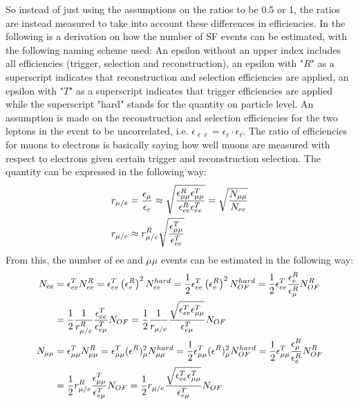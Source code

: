 So instead of just using the assumptions on the ratios to be 0.5 or 1, the ratios are instead measured to take into account these differences in efficiencies. 
In the following is a derivation on how the number of SF events can be estimated, with the following naming scheme used: 
An epsilon without an upper index includes all efficiencies (trigger, selection and reconstruction), an epsilon with "$R$" as a superscript indicates that reconstruction and selection efficiencies are applied, an epsilon with "$T$" as a superscript indicates that trigger efficiencies are applied while the superscript "hard" stands for the quantity on particle level.
An assumption is made on the reconstruction and selection efficiencies for the two leptons in the event to be uncorrelated, i.e. $\epsilon_{\ell\ell}=\epsilon_{\ell} \cdot \epsilon_{\ell}$. 
The ratio of efficiencies for muons to electrons is basically saying how well muons are measured with respect to electrons given certain trigger and reconstruction selection. 
The quantity can be expressed in the following way:
\begin{align}
\label{eq:rMue}
r_{\mu/e} & = \frac{\epsilon_{\mu}}{\epsilon_{e}} \approx \sqrt{ \frac{\epsilon^{R}_{\mu\mu}\epsilon^{T}_{\mu\mu}}{\epsilon^{R}_{ee}\epsilon^{T}_{ee}}} = \sqrt{ \frac{N_{\mu\mu}}{N_{ee}}} \notag \\
r_{\mu/e} & \approx r^{R}_{\mu/e}\sqrt{ \frac{\epsilon^{T}_{\mu\mu}}{\epsilon^{T}_{ee}}}
\end{align}
From this, the number of ee and $\mu\mu$ events can be estimated in the following way:
\begin{align}
\label{eq:eemumuFormula}
N_{ee} & = \epsilon^{T}_{ee} N^{R}_{ee} = \epsilon^{T}_{ee} \left(\epsilon^{R}_{e}\right)^{2} N^{hard}_{ee} = \frac{1}{2} \epsilon^{T}_{ee} \left(\epsilon^{R}_{e}\right)^{2} N^{hard}_{OF} 
										= \frac{1}{2} \epsilon^{T}_{ee} \frac{\epsilon^{R}_{e}}{\epsilon^{R}_{\mu}} N^{R}_{OF} \notag \\
       & =\frac{1}{2} \frac{1}{r^{R}_{\mu/e}} \frac{\epsilon^{T}_{ee}}{\epsilon^{T}_{e\mu}}N_{OF} 
										= \frac{1}{2} \frac{1}{r_{\mu/e}} \frac{\sqrt{\epsilon^{T}_{ee}\epsilon^{T}_{\mu\mu}}}{\epsilon^{T}_{e\mu}} N_{OF}  \notag \\
N_{\mu\mu} & = \epsilon^{T}_{\mu\mu} N^{R}_{\mu\mu} = \epsilon^{T}_{\mu\mu} (\epsilon^{R})^{2}_{\mu} N^{hard}_{\mu\mu} = \frac{1}{2} \epsilon^{T}_{\mu\mu} (\epsilon^{R})^{2}_{\mu} N^{hard}_{OF}
										= \frac{1}{2} \epsilon^{T}_{\mu\mu} \frac{\epsilon^{R}_{\mu}}{\epsilon^{R}_{e}} N^{R}_{OF}  \notag \\
	  & =\frac{1}{2} r^{R}_{\mu/e} \frac{\epsilon^{T}_{\mu\mu}}{\epsilon^{T}_{e\mu}}N_{OF} = \frac{1}{2} r_{\mu/e} \frac{\sqrt{\epsilon^{T}_{ee}\epsilon^{T}_{\mu\mu}}}{\epsilon^{T}_{e\mu}} N_{OF}
\end{align}
